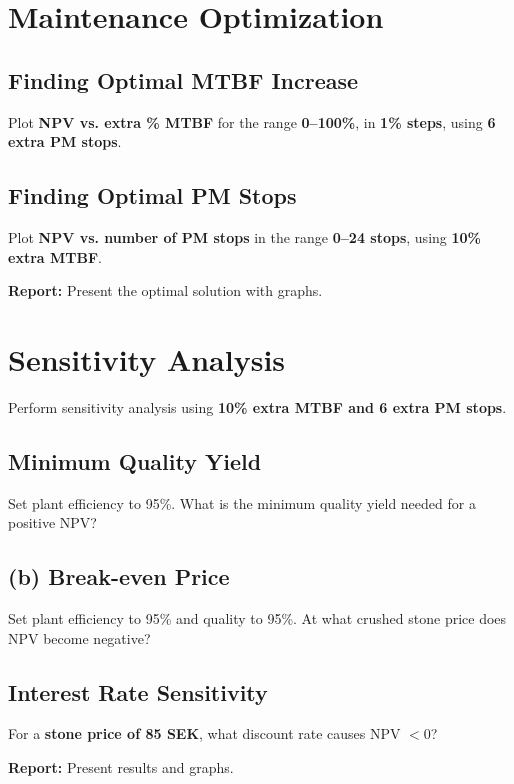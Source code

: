 \documentclass[a4paper,12pt]{exam}
\begin{document}
\section{Maintenance Optimization}
\subsection{Finding Optimal MTBF Increase}
Plot \textbf{NPV vs. extra \% MTBF} for the range \textbf{0–100\%}, in \textbf{1\% steps}, using \textbf{6 extra PM stops}.

\subsection{Finding Optimal PM Stops}
Plot \textbf{NPV vs. number of PM stops} in the range \textbf{0–24 stops}, using \textbf{10\% extra MTBF}.

\textbf{Report:} Present the optimal solution with graphs.

\section{Sensitivity Analysis}
Perform sensitivity analysis using \textbf{10\% extra MTBF and 6 extra PM stops}.

\subsection{Minimum Quality Yield}
Set plant efficiency to 95\%. What is the minimum quality yield needed for a positive NPV? 

\subsection{(b) Break-even Price}
Set plant efficiency to 95\% and quality to 95\%. At what crushed stone price does NPV become negative?

\subsection{Interest Rate Sensitivity}
For a \textbf{stone price of 85 SEK}, what discount rate causes NPV $<0$?

\textbf{Report:} Present results and graphs.
\end{document}

